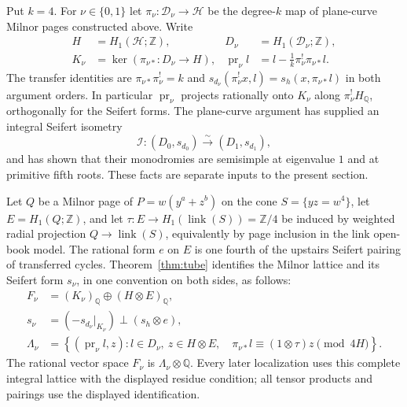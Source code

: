 Put $k=4$.  For $\nu\in\{0,1\}$ let
$\pi_\nu\colon\mathcal D_\nu\to\mathcal H$ be the degree-$k$ map of
plane-curve Milnor pages constructed above.  Write
\[
 \begin{aligned}
 H&=H_1(\mathcal H;\mathbb Z),&
 D_\nu&=H_1(\mathcal D_\nu;\mathbb Z),\\
 K_\nu&=\ker(\pi_{\nu*}\colon D_\nu\to H),&
 \operatorname{pr}_\nu l
   &=l-\frac1k\pi_\nu^!\pi_{\nu*}l.
 \end{aligned}
\]
The transfer identities are $\pi_{\nu*}\pi_\nu^!=k$ and
$s_{d_\nu}(\pi_\nu^!x,l)=s_h(x,\pi_{\nu*}l)$ in both argument orders.
In particular $\operatorname{pr}_\nu$ projects rationally onto $K_\nu$
along $\pi_\nu^!H_{\mathbb Q}$, orthogonally for the Seifert forms.
The plane-curve argument has supplied an integral Seifert isometry
\begin{equation}\label{eq:arith-plane-isometry}
 \mathcal I\colon(D_0,s_{d_0})\xrightarrow{\ \sim\ }(D_1,s_{d_1}),
\end{equation}
and has shown that their monodromies are semisimple at eigenvalue
$1$ and at primitive fifth roots.  These facts are separate inputs to the
present section.

Let $Q$ be a Milnor page of $P=w(y^a+z^b)$ on the cone
$S=\{yz=w^4\}$, let $E=H_1(Q;\mathbb Z)$, and let
$\tau\colon E\to H_1(\operatorname{link}(S))=\mathbb Z/4$ be induced by
weighted radial projection $Q\to\operatorname{link}(S)$, equivalently
by page inclusion in the link open-book model. The rational form $e$
on $E$ is one fourth of the upstairs Seifert pairing of transferred
cycles. Theorem~\ref{thm:tube} identifies the Milnor lattice and its
Seifert form $s_\nu$, in one convention on both sides, as follows:
\begin{equation}\label{eq:arith-input-lattice}
 \begin{split}
 F_\nu&=(K_\nu)_{\mathbb Q}\oplus(H\otimes E)_{\mathbb Q},\\
 s_\nu&=(-s_{d_\nu}|_{K_\nu})\perp(s_h\otimes e),\\
 \Lambda_\nu&=
 \left\{(\operatorname{pr}_\nu l,z):
       l\in D_\nu,\ z\in H\otimes E,\quad
       \pi_{\nu*}l\equiv(1\otimes\tau)z\pmod{4H}\right\}.
 \end{split}
\end{equation}
The rational vector space $F_\nu$ is $\Lambda_\nu\otimes\mathbb Q$.
Every later localization uses this complete integral lattice with the
displayed residue condition; all tensor products and pairings use the
displayed identification.

